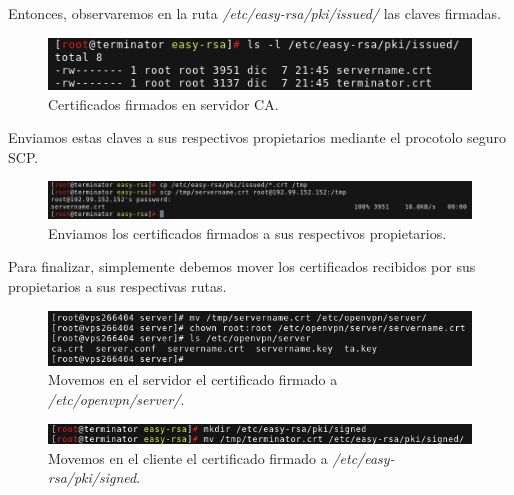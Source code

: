 \documentclass[a4paper, 11pt, titlepage]{article}
\begin{document}
            Entonces, observaremos en la ruta \textit{/etc/easy-rsa/pki/issued/} las claves firmadas.
        
            \begin{figure}[htp]
                \centering
                \includegraphics[width=1\textwidth]{resources/ca19.png}
                \caption{Certificados firmados en servidor CA.}
                \label{ca19}
            \end{figure}
        
            Enviamos estas claves a sus respectivos propietarios mediante el procotolo seguro SCP.
        
            \begin{figure}[htp]
                \centering
                \includegraphics[width=1\textwidth]{resources/ca20.png}
                \caption{Enviamos los certificados firmados a sus respectivos propietarios.}
                \label{ca20}
            \end{figure}
        
            Para finalizar, simplemente debemos mover los certificados recibidos por sus propietarios
            a sus respectivas rutas.
        
            \begin{figure}[htp]
                \centering
                \includegraphics[width=1\textwidth]{resources/ca21.png}
                \caption{Movemos en el servidor el certificado firmado a \textit{/etc/openvpn/server/}.}
                \label{ca21}
            \end{figure}
        
            \begin{figure}[htp]
                \centering
                \includegraphics[width=1\textwidth]{resources/ca22.png}
                \caption{Movemos en el cliente el certificado firmado a \textit{/etc/easy-rsa/pki/signed}.}
                \label{ca22}
            \end{figure}
    
\end{document}
